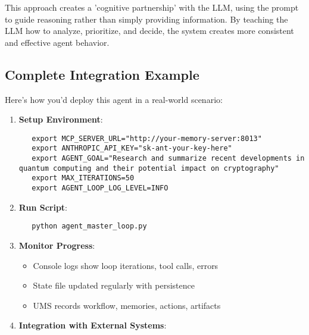 \documentclass[12pt,a4paper]{article}
\begin{document}
This approach creates a 'cognitive partnership' with the LLM, using the prompt to guide reasoning rather than simply providing information. By teaching the LLM how to analyze, prioritize, and decide, the system creates more consistent and effective agent behavior.

\subsection*{Complete Integration Example}

Here's how you'd deploy this agent in a real-world scenario:

\begin{enumerate}[label=\arabic*.]
    \item \textbf{Setup Environment}:
    \begin{pageablecode}
    \begin{verbatim}
   export MCP_SERVER_URL="http://your-memory-server:8013"
   export ANTHROPIC_API_KEY="sk-ant-your-key-here"
   export AGENT_GOAL="Research and summarize recent developments in quantum computing and their potential impact on cryptography"
   export MAX_ITERATIONS=50
   export AGENT_LOOP_LOG_LEVEL=INFO
    \end{verbatim}
    \end{pageablecode}
    \item \textbf{Run Script}:
    \begin{pageablecode}
    \begin{verbatim}
   python agent_master_loop.py
    \end{verbatim}
    \end{pageablecode}
    \item \textbf{Monitor Progress}:
    \begin{itemize}
        \item Console logs show loop iterations, tool calls, errors
        \item State file updated regularly with persistence
        \item UMS records workflow, memories, actions, artifacts
    \end{itemize}
    \item \textbf{Integration with External Systems}:
    \begin{itemize}

\end{itemize}
\end{enumerate}
\end{document}
